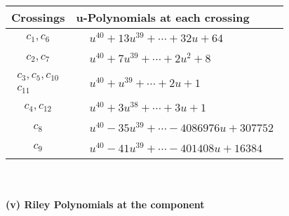 \documentclass[1p]{elsarticle_modified}
\theoremstyle{definition}
\begin{document}
\begin{tabular}{m{50pt}|m{274pt}}
Crossings & \hspace{64pt}u-Polynomials at each crossing \\
\hline $$\begin{aligned}c_{1},c_{6}\end{aligned}$$&$\begin{aligned}
&u^{40}+13 u^{39}+\cdots+32 u+64
\end{aligned}$\\
\hline $$\begin{aligned}c_{2},c_{7}\end{aligned}$$&$\begin{aligned}
&u^{40}+7 u^{39}+\cdots+2 u^2+8
\end{aligned}$\\
\hline $$\begin{aligned}c_{3},c_{5},c_{10}\\c_{11}\end{aligned}$$&$\begin{aligned}
&u^{40}+u^{39}+\cdots+2 u+1
\end{aligned}$\\
\hline $$\begin{aligned}c_{4},c_{12}\end{aligned}$$&$\begin{aligned}
&u^{40}+3 u^{38}+\cdots+3 u+1
\end{aligned}$\\
\hline $$\begin{aligned}c_{8}\end{aligned}$$&$\begin{aligned}
&u^{40}-35 u^{39}+\cdots-4086976 u+307752
\end{aligned}$\\
\hline $$\begin{aligned}c_{9}\end{aligned}$$&$\begin{aligned}
&u^{40}-41 u^{39}+\cdots-401408 u+16384
\end{aligned}$\\
\hline
\end{tabular}\\~\\
\newpage\renewcommand{\arraystretch}{1}
\flushleft \textbf{(v) Riley Polynomials at the component}\newline \\
\end{document}
